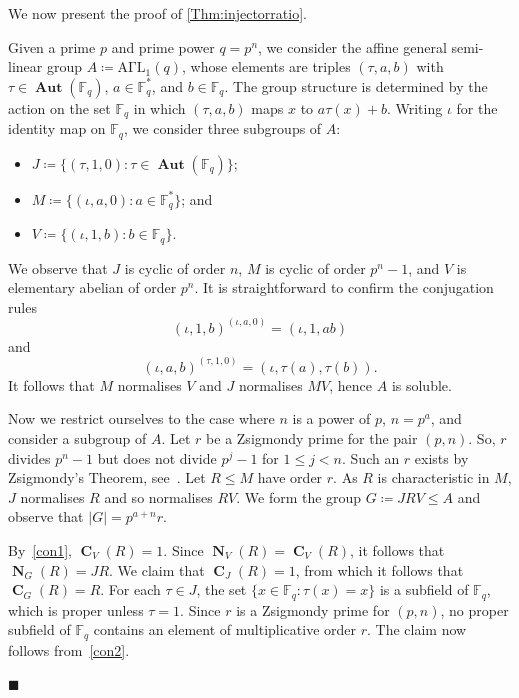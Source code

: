 \documentclass[a4paper,12pt,reqno]{amsart}
\numberwithin{equation}{section}
\DeclareMathOperator{\N}{\mathbf{N}}
\DeclareMathOperator{\cent}{\mathbf{C}}
\DeclareMathOperator{\aut}{\mathbf{Aut}}
\renewcommand{\leq}{\leqslant}
\newenvironment{proofofC}{{\bf {Proof of Theorem \ref{Thm:injectorratio}.} }}{\hfill $\blacksquare$ \\}
\def\ff{{\mathbb F}}
\begin{document}
We now present the proof of \autoref{Thm:injectorratio}.

\begin{proofofC}
Given a prime $p$ and prime power $q = p^n$, 
we consider the affine general semi-linear group $A \coloneqq \mathrm{A\Gamma L}_1(q)$, 
whose elements are triples $(\tau, a, b)$ 
with $\tau \in \aut(\ff_q)$, $a \in \ff_q^\ast$, and $b \in \ff_q$. 
The group structure is determined by the action on the set $\ff_q$ 
in which $(\tau, a, b)$ maps $x$ to $a\tau(x) + b$. 
Writing $\iota$ for the identity map on $\ff_q$, 
we consider three subgroups of $A$:
\begin{itemize}
\item $J \coloneqq \{(\tau, 1, 0) : \tau \in \aut(\ff_q)\}$;
\item $M \coloneqq \{(\iota, a, 0) :a \in \ff_q^\ast\}$; and
\item $V \coloneqq \{(\iota, 1, b) : b \in \ff_q\}$.
\end{itemize}
We observe that $J$ is cyclic of order $n$, 
$M$ is cyclic of order $p^n-1$, 
and $V$ is elementary abelian of order $p^n$.  
It is straightforward to confirm the conjugation rules
\begin{equation}\label{con1}
(\iota, 1, b)^{(\iota, a, 0)} = (\iota, 1, ab)
\end{equation}
and
\begin{equation}\label{con2}
(\iota, a, b)^{(\tau, 1, 0)} = (\iota, \tau(a), \tau(b)).
\end{equation}
It follows that $M$ normalises $V$ and $J$ normalises $MV$, 
hence $A$ is soluble.

Now we restrict ourselves to the case where $n$ is a power of $p$, $n = p^a$, 
and consider a subgroup of $A$. 
Let $r$ be a Zsigmondy prime for the pair $(p, n)$. 
So, $r$ divides $p^n-1$ but does not divide $p^j-1$ for $1 \leq j < n$. 
Such an $r$ exists by Zsigmondy's Theorem, see~\cite{Zsigmondy}. 
Let $R \leq M$ have order $r$. 
As $R$ is characteristic in $M$, $J$ normalises $R$ and so normalises $RV$. 
We form the group $G \coloneqq JRV \leq A$ and observe that $|G| = p^{a+n}r$.

By~\eqref{con1}, $\cent_V(R) = 1$. 
Since $\N_V(R) = \cent_V(R)$, it follows that $\N_G(R) = JR$.
We claim that $\cent_J(R) = 1$, 
from which it follows that $\cent_G(R) = R$. 
For each $\tau \in J$, the set $\{x \in \ff_q : \tau(x) = x\}$ is a subfield of $\ff_q$, which is proper unless $\tau = 1$. 
Since $r$ is a Zsigmondy prime for $(p, n)$, no proper subfield of $\ff_q$ contains an element of multiplicative order $r$. 
The claim now follows from~\eqref{con2}.


\end{proofofC}
\end{document}
